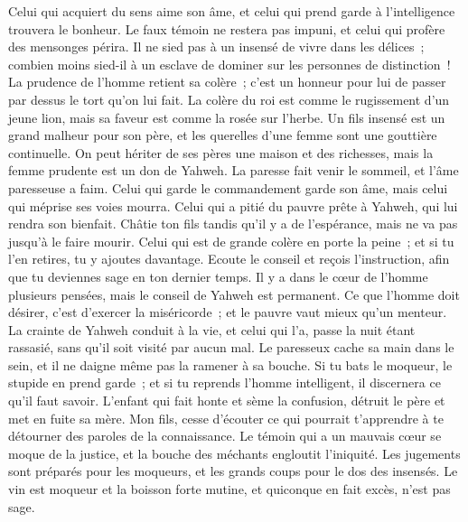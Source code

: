 \begin{multicols}{2}
Celui qui acquiert du sens aime son âme, et celui qui prend garde à l'intelligence trouvera le bonheur.
Le faux témoin ne restera pas impuni, et celui qui profère des mensonges périra.
Il ne sied pas à un insensé de vivre dans les délices~; combien moins sied-il à un esclave de dominer sur les personnes de distinction~!
La prudence de l'homme retient sa colère~; c'est un honneur pour lui de passer par dessus le tort qu'on lui fait.
La colère du roi est comme le rugissement d'un jeune lion, mais sa faveur est comme la rosée sur l'herbe.
Un fils insensé est un grand malheur pour son père, et les querelles d'une femme sont une gouttière continuelle.
On peut hériter de ses pères une maison et des richesses, mais la femme prudente est un don de Yahweh.
La paresse fait venir le sommeil, et l'âme paresseuse a faim.
Celui qui garde le commandement garde son âme, mais celui qui méprise ses voies mourra.
Celui qui a pitié du pauvre prête à Yahweh, qui lui rendra son bienfait.
Châtie ton fils tandis qu'il y a de l'espérance, mais ne va pas jusqu'à le faire mourir.
Celui qui est de grande colère en porte la peine~; et si tu l'en retires, tu y ajoutes davantage.
Ecoute le conseil et reçois l'instruction, afin que tu deviennes sage en ton dernier temps.
Il y a dans le cœur de l'homme plusieurs pensées, mais le conseil de Yahweh est permanent.
Ce que l'homme doit désirer, c'est d'exercer la miséricorde~; et le pauvre vaut mieux qu'un menteur.
La crainte de Yahweh conduit à la vie, et celui qui l'a, passe la nuit étant rassasié, sans qu'il soit visité par aucun mal.
Le paresseux cache sa main dans le sein, et il ne daigne même pas la ramener à sa bouche.
Si tu bats le moqueur, le stupide en prend garde~; et si tu reprends l'homme intelligent, il discernera ce qu'il faut savoir.
L'enfant qui fait honte et sème la confusion, détruit le père et met en fuite sa mère.
Mon fils, cesse d'écouter ce qui pourrait t'apprendre à te détourner des paroles de la connaissance.
Le témoin qui a un mauvais cœur se moque de la justice, et la bouche des méchants engloutit l'iniquité.
Les jugements sont préparés pour les moqueurs, et les grands coups pour le dos des insensés.
\VerseOne{}Le vin est moqueur et la boisson forte mutine, et quiconque en fait excès, n'est pas sage.

\end{multicols}
